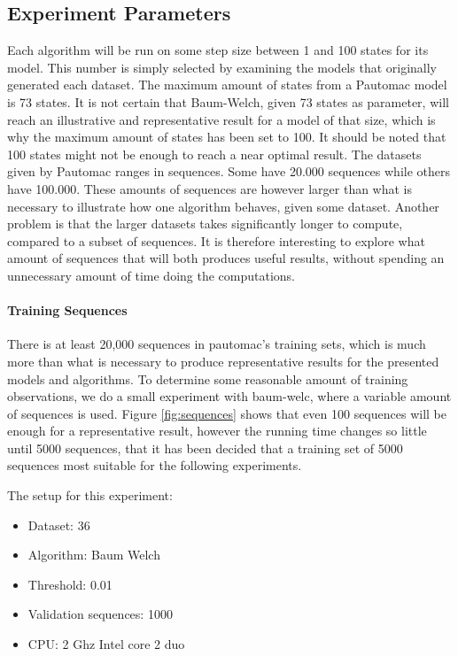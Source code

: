 \subsection{Experiment Parameters}
Each algorithm will be run on some step size between 1 and 100 states for its model. This number is simply selected by examining the models that originally generated each dataset. The maximum amount of states from a Pautomac model is 73 states. It is not certain that Baum-Welch, given 73 states as parameter, will reach an illustrative and representative result for a model of that size, which is why the maximum amount of states has been set to 100. It should be noted that 100 states might not be enough to reach a near optimal result.
The datasets given by Pautomac ranges in sequences. Some have 20.000 sequences while others have 100.000. These amounts of sequences are however larger than what is necessary to illustrate how one algorithm behaves, given some dataset. Another problem is that the larger datasets takes significantly longer to compute, compared to a subset of sequences. It is therefore interesting to explore what amount of sequences that will both produces useful results, without spending an unnecessary amount of time doing the computations.

\paragraph{Training Sequences}
There is at least 20,000 sequences in pautomac's training sets, which is much more than what is necessary to produce representative results for the presented models and algorithms. To determine some reasonable amount of training observations, we do a small experiment with \gls{baum-welc}, where a variable amount of sequences is used. Figure \ref{fig:sequences} shows that even 100 sequences will be enough for a representative result, however the running time changes so little until 5000 sequences, that it has been decided that a training set of 5000 sequences most suitable for the following experiments.

The setup for this experiment:
\begin{itemize}
\item Dataset: 36
\item Algorithm: Baum Welch
\item Threshold: 0.01
\item Validation sequences: 1000
\item CPU: 2 Ghz Intel core 2 duo
\end{itemize}


